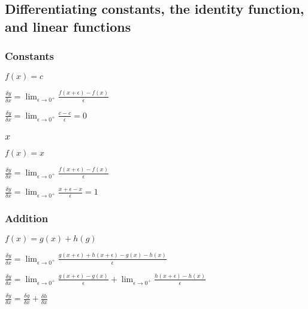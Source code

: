 
\subsection{Differentiating constants, the identity function, and linear functions}

\subsubsection{Constants}

\(f(x)=c\)

\(\frac{\delta y}{\delta x}=\lim_{\epsilon \rightarrow 0^+}\frac{f(x+\epsilon )-f(x)}{\epsilon }\)

\(\frac{\delta y}{\delta x}=\lim_{\epsilon \rightarrow 0^+}\frac{c-c}{\epsilon }=0\)

\subsubsection{\(x\)}

\(f(x)=x\)

\(\frac{\delta y}{\delta x}=\lim_{\epsilon \rightarrow 0^+}\frac{f(x+\epsilon )-f(x)}{\epsilon }\)

\(\frac{\delta y}{\delta x}=\lim_{\epsilon \rightarrow 0^+}\frac{x+\epsilon -x}{\epsilon }=1\)

\subsubsection{Addition}

\(f(x)=g(x)+h(g)\)

\(\frac{\delta y}{\delta x}=\lim_{\epsilon \rightarrow 0^+}\frac{g(x+\epsilon )+h(x+\epsilon )-g(x)-h(x)}{\epsilon }\)

\(\frac{\delta y}{\delta x}=\lim_{\epsilon \rightarrow 0^+}\frac{g(x+\epsilon )-g(x)}{\epsilon }+\lim_{\epsilon \rightarrow 0^+}\frac{h(x+\epsilon )-h(x)}{\epsilon }\)

\(\frac{\delta y}{\delta x}=\frac{\delta g}{\delta x}+\frac{\delta h}{\delta x}\)

